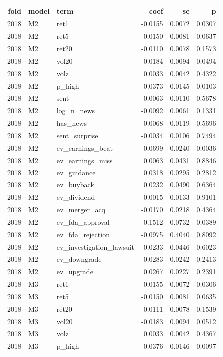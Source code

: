 \begin{tabular}{rllrrr}
\toprule
fold & model & term & coef & se & p \\
\midrule
2018 & M2 & ret1 & -0.0155 & 0.0072 & 0.0307 \\
2018 & M2 & ret5 & -0.0150 & 0.0081 & 0.0637 \\
2018 & M2 & ret20 & -0.0110 & 0.0078 & 0.1573 \\
2018 & M2 & vol20 & -0.0184 & 0.0094 & 0.0494 \\
2018 & M2 & volz & 0.0033 & 0.0042 & 0.4322 \\
2018 & M2 & p\_high & 0.0373 & 0.0145 & 0.0103 \\
2018 & M2 & sent & 0.0063 & 0.0110 & 0.5678 \\
2018 & M2 & log\_n\_news & -0.0092 & 0.0061 & 0.1331 \\
2018 & M2 & has\_news & 0.0068 & 0.0119 & 0.5696 \\
2018 & M2 & sent\_surprise & -0.0034 & 0.0106 & 0.7494 \\
2018 & M2 & ev\_earnings\_beat & 0.0699 & 0.0240 & 0.0036 \\
2018 & M2 & ev\_earnings\_miss & 0.0063 & 0.0431 & 0.8846 \\
2018 & M2 & ev\_guidance & 0.0318 & 0.0295 & 0.2812 \\
2018 & M2 & ev\_buyback & 0.0232 & 0.0490 & 0.6364 \\
2018 & M2 & ev\_dividend & 0.0015 & 0.0133 & 0.9101 \\
2018 & M2 & ev\_merger\_acq & -0.0170 & 0.0218 & 0.4364 \\
2018 & M2 & ev\_fda\_approval & -0.1512 & 0.0732 & 0.0389 \\
2018 & M2 & ev\_fda\_rejection & -0.0975 & 0.4040 & 0.8092 \\
2018 & M2 & ev\_investigation\_lawsuit & 0.0233 & 0.0446 & 0.6023 \\
2018 & M2 & ev\_downgrade & 0.0283 & 0.0242 & 0.2413 \\
2018 & M2 & ev\_upgrade & 0.0267 & 0.0227 & 0.2391 \\
2018 & M3 & ret1 & -0.0155 & 0.0072 & 0.0306 \\
2018 & M3 & ret5 & -0.0150 & 0.0081 & 0.0635 \\
2018 & M3 & ret20 & -0.0111 & 0.0078 & 0.1539 \\
2018 & M3 & vol20 & -0.0183 & 0.0094 & 0.0512 \\
2018 & M3 & volz & 0.0033 & 0.0042 & 0.4367 \\
2018 & M3 & p\_high & 0.0376 & 0.0146 & 0.0097 \\

\end{tabular}
